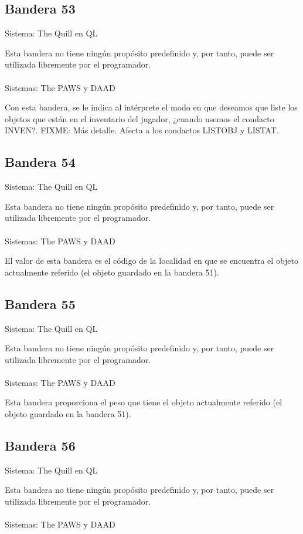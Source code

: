 \documentclass[11pt, a5paper]{article}
\newcommand{\quill}{\textsf{The Quill}\xspace}
\newcommand{\paw}{\textsf{The PAWS}\xspace}
\newcommand{\daad}{\textsf{DAAD}\xspace}
\newcommand{\sistema}[1]{\noindent Sistema: #1 \nopagebreak}
\newcommand{\sistemas}[1]{\noindent Sistemas: #1 \nopagebreak}
\begin{document}
\subsection{Bandera 53}

\sistema{\quill en QL}

Esta bandera no tiene ningún propósito predefinido y, por tanto, puede ser utilizada libremente por el programador.
\\\ \\
\sistemas{\paw y \daad}

Con esta bandera, se le indica al intérprete el modo en que deseamos que liste los objetos que están en el inventario del jugador, ¿cuando usemos el condacto INVEN?. FIXME: Más detalle. Afecta a los condactos LISTOBJ y LISTAT.

\subsection{Bandera 54}

\sistema{\quill en QL}

Esta bandera no tiene ningún propósito predefinido y, por tanto, puede ser utilizada libremente por el programador.
\\\ \\
\sistemas{\paw y \daad}

El valor de esta bandera es el código de la localidad en que se encuentra el objeto actualmente referido (el objeto guardado en la bandera 51).

\subsection{Bandera 55}

\sistema{\quill en QL}

Esta bandera no tiene ningún propósito predefinido y, por tanto, puede ser utilizada libremente por el programador.
\\\ \\
\sistemas{\paw y \daad}

Esta bandera proporciona el peso que tiene el objeto actualmente referido (el objeto guardado en la bandera 51).

\subsection{Bandera 56}

\sistema{\quill en QL}

Esta bandera no tiene ningún propósito predefinido y, por tanto, puede ser utilizada libremente por el programador.
\\\ \\
\sistemas{\paw y \daad}
\end{document}
